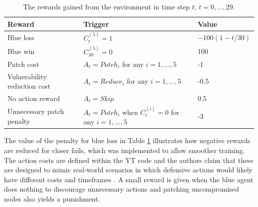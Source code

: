 \documentclass{article}
\begin{document}
\begin{table}[h!]
    \centering
    \small
    \begin{tabular}{| m{} | m{} | m{}|} 
      \hline
       \textbf{Reward} & \textbf{Trigger} & \textbf{Value} \\ 
      \hline
        Blue loss & $C^{(5)}_t = 1$   & $-100(1-t/30)$ \\ 
      \hline
        Blue win & $C^{(5)}_{30} = 0$ & 100 \\ 
      \hline 
        Patch cost & $A_t= Patch_i$ for any $i = 1,...,5$ & -1 \\ 
      \hline
        Vulnerability reduction cost & $A_t= Reduce_i$ for any $i = 1,...,5$ & -0.5 \\ 
      \hline
        No action reward & $A_t= Skip$  & 0.5 \\
      \hline
        Unnecessary patch penalty & $A_t = Patch_i$ when $C^{(i)}_t = 0$ for any $i = 1,...,5$ & -3 \\       %
      \hline
     
    \end{tabular}
    \caption{The rewards gained from the environment in time step $t$, $t = 0,...,29$. 
    }
    \label{tab:rewards}
\end{table}


\noindent The value of the penalty for blue loss in Table \ref{tab:rewards} illustrates how negative rewards are reduced for closer fails, which was implemented to allow smoother training. The action costs are defined within the YT code and the authors claim that these are designed to mimic real-world scenarios in which defensive actions would likely have different costs and timeframes \cite{collyer2022acd}. A small reward is given when the blue agent does nothing to discourage unnecessary actions and patching uncompromised nodes also yields a punishment. 

\end{document}
